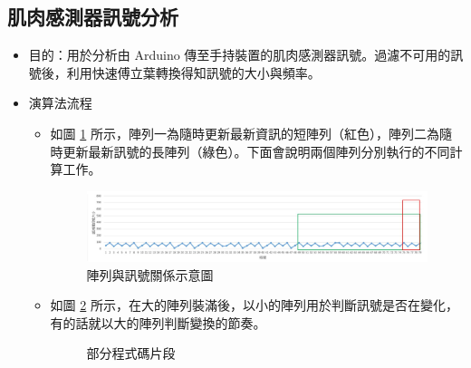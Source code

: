 \documentclass[12pt]{article}  %
\theoremstyle{plain}
\begin{document}
\subsection{肌肉感測器訊號分析}
\begin{itemize}
\item 目的：用於分析由 Arduino 傳至手持裝置的肌肉感測器訊號。過濾不可用的訊號後，利用快速傅立葉轉換得知訊號的大小與頻率。
\item 演算法流程
\begin{itemize}
\item 如圖 \ref{陣列與訊號關係示意圖} 所示，陣列一為隨時更新最新資訊的短陣列（紅色），陣列二為隨時更新最新訊號的長陣列（綠色）。下面會說明兩個陣列分別執行的不同計算工作。
\begin{figure}[htbp]
\centering
\includegraphics[width=15cm]{pic/ch3/陣列與訊號關係示意圖.JPG}
\caption{陣列與訊號關係示意圖} \label{陣列與訊號關係示意圖}
\end{figure}

\item 如圖 \ref{部分程式碼片段} 所示，在大的陣列裝滿後，以小的陣列用於判斷訊號是否在變化，有的話就以大的陣列判斷變換的節奏。
\begin{figure}[htbp]
\quad
{}
\caption{部分程式碼片段} \label{部分程式碼片段}
\end{figure}


\end{itemize}
\end{itemize}
\end{document}
